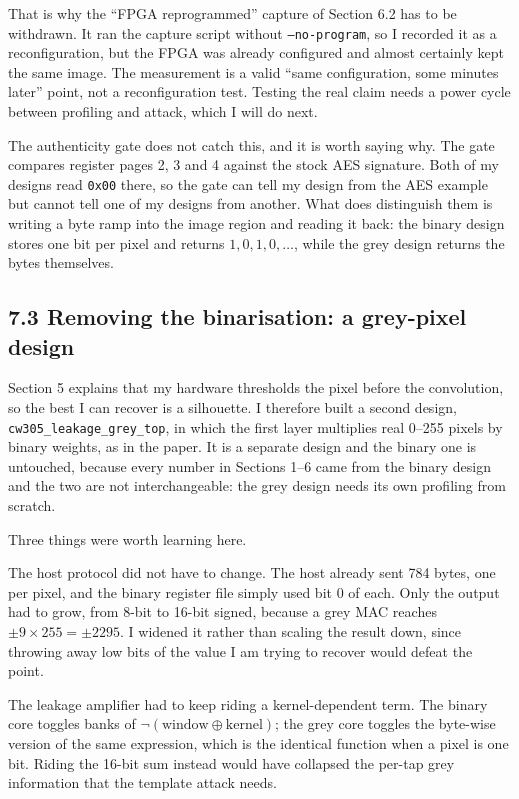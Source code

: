 \documentclass[11pt,a4paper]{article}
\begin{document}
That is why the ``FPGA reprogrammed'' capture of Section 6.2 has to be withdrawn. It
ran the capture script without \texttt{--no-program}, so I recorded it as a
reconfiguration, but the FPGA was already configured and almost certainly kept the same
image. The measurement is a valid ``same configuration, some minutes later'' point, not
a reconfiguration test. Testing the real claim needs a power cycle between profiling and
attack, which I will do next.

The authenticity gate does not catch this, and it is worth saying why. The gate compares
register pages 2, 3 and 4 against the stock AES signature. Both of my designs read
\texttt{0x00} there, so the gate can tell my design from the AES example but cannot tell
one of my designs from another. What does distinguish them is writing a byte ramp into
the image region and reading it back: the binary design stores one bit per pixel and
returns $1,0,1,0,\ldots$, while the grey design returns the bytes themselves.

\subsection*{7.3 Removing the binarisation: a grey-pixel design}

Section 5 explains that my hardware thresholds the pixel before the convolution, so the
best I can recover is a silhouette. I therefore built a second design,
\texttt{cw305\_leakage\_grey\_top}, in which the first layer multiplies real 0--255
pixels by binary weights, as in the paper. It is a separate design and the binary one is
untouched, because every number in Sections 1--6 came from the binary design and the two
are not interchangeable: the grey design needs its own profiling from scratch.

Three things were worth learning here.

The host protocol did not have to change. The host already sent 784 bytes, one per
pixel, and the binary register file simply used bit 0 of each. Only the output had to
grow, from 8-bit to 16-bit signed, because a grey MAC reaches $\pm 9\times255 = \pm2295$.
I widened it rather than scaling the result down, since throwing away low bits of the
value I am trying to recover would defeat the point.

The leakage amplifier had to keep riding a kernel-dependent term. The binary core
toggles banks of $\lnot(\text{window} \oplus \text{kernel})$; the grey core toggles the
byte-wise version of the same expression, which is the identical function when a pixel
is one bit. Riding the 16-bit sum instead would have collapsed the per-tap grey
information that the template attack needs.
\end{document}
